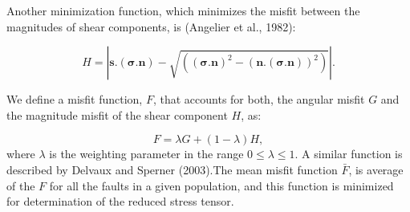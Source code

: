 Another minimization function, which minimizes the misfit between the magnitudes of shear components, is (Angelier et al., 1982):

\begin{equation} \label{16}
H = \left| \bm{s} . (\bm{\sigma}.\bm{n}) - \sqrt{( (\bm{\sigma}.\bm{n})^2 - (\bm{n} . (\bm{\sigma}.\bm{n}))^2 )} \right|.
\end{equation}

We define a misfit function, $F$, that accounts for both, the angular misfit $G$ and the magnitude misfit of the shear component $H$, as:

\begin{equation} \label{17}
F = \lambda G + (1-\lambda) H,
\end{equation}
where $\lambda$ is the weighting parameter in the range $0 \le \lambda \le 1$. A similar function is described by Delvaux and Sperner (2003).The mean misfit function $\bar{F}$, is average of the $F$ for all the faults in a given population, and this function is minimized for determination of the reduced stress tensor.